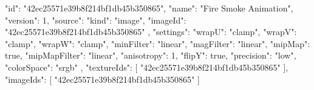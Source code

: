 {
  "id": "42ec25571e39b8f214bf1db45b350865",
  "name": "Fire Smoke Animation",
  "version": 1,
  "source": {
    "kind": "image",
    "imageId": "42ec25571e39b8f214bf1db45b350865"
  },
  "settings": {
    "wrapU": "clamp",
    "wrapV": "clamp",
    "wrapW": "clamp",
    "minFilter": "linear",
    "magFilter": "linear",
    "mipMap": true,
    "mipMapFilter": "linear",
    "anisotropy": 1,
    "flipY": true,
    "precision": "low",
    "colorSpace": "srgb"
  },
  "textureIds": [
    "42ec25571e39b8f214bf1db45b350865"
  ],
  "imageIds": [
    "42ec25571e39b8f214bf1db45b350865"
  ]
}
